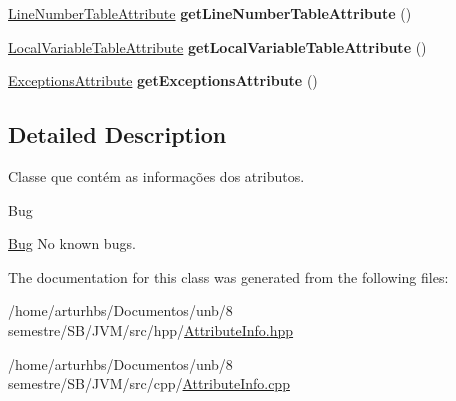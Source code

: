 \begin{DoxyCompactItemize}
\item 
\hyperlink{classLineNumberTableAttribute}{Line\+Number\+Table\+Attribute} {\bfseries get\+Line\+Number\+Table\+Attribute} ()\hypertarget{classAttributeInfo_a17bc4e1435137d714da8942171f82012}{}\label{classAttributeInfo_a17bc4e1435137d714da8942171f82012}

\item 
\hyperlink{classLocalVariableTableAttribute}{Local\+Variable\+Table\+Attribute} {\bfseries get\+Local\+Variable\+Table\+Attribute} ()\hypertarget{classAttributeInfo_a916735dc9f933dbc80ac4e7d61a07768}{}\label{classAttributeInfo_a916735dc9f933dbc80ac4e7d61a07768}

\item 
\hyperlink{classExceptionsAttribute}{Exceptions\+Attribute} {\bfseries get\+Exceptions\+Attribute} ()\hypertarget{classAttributeInfo_a0b0f4877987a0ce9eebe156871afe2d7}{}\label{classAttributeInfo_a0b0f4877987a0ce9eebe156871afe2d7}

\end{DoxyCompactItemize}


\subsection{Detailed Description}
Classe que contém as informações dos atributos. 

\begin{DoxyRefDesc}{Bug}
\item[\hyperlink{bug__bug000013}{Bug}]No known bugs. \end{DoxyRefDesc}


The documentation for this class was generated from the following files\+:\begin{DoxyCompactItemize}
\item 
/home/arturhbs/\+Documentos/unb/8 semestre/\+S\+B/\+J\+V\+M/src/hpp/\hyperlink{AttributeInfo_8hpp}{Attribute\+Info.\+hpp}\item 
/home/arturhbs/\+Documentos/unb/8 semestre/\+S\+B/\+J\+V\+M/src/cpp/\hyperlink{AttributeInfo_8cpp}{Attribute\+Info.\+cpp}\end{DoxyCompactItemize}
